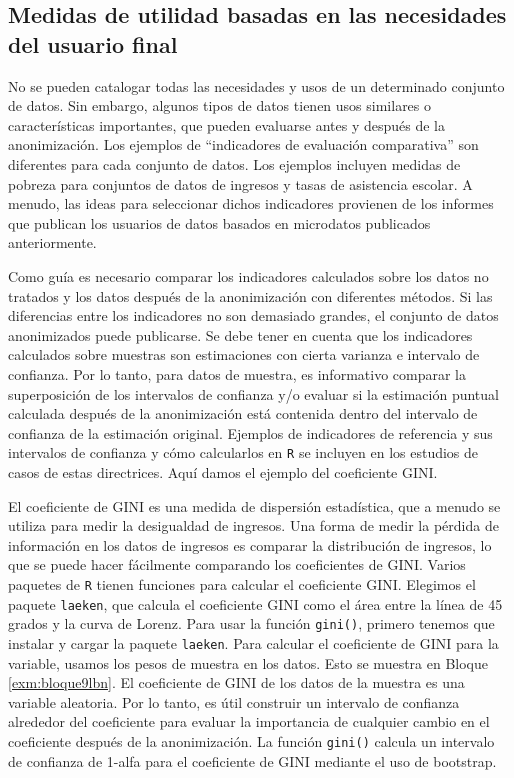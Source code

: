 \documentclass[]{book}
\theoremstyle{definition}
\theoremstyle{definition}
\theoremstyle{definition}
\theoremstyle{definition}
\theoremstyle{remark}
\begin{document}
\hypertarget{medidas-de-utilidad-basadas-en-las-necesidades-del-usuario-final}{%
\subsection{Medidas de utilidad basadas en las necesidades del usuario final}\label{medidas-de-utilidad-basadas-en-las-necesidades-del-usuario-final}}

No se pueden catalogar todas las necesidades y usos de un determinado conjunto de datos. Sin embargo, algunos tipos de datos tienen usos similares o características importantes, que pueden evaluarse antes y después de la anonimización. Los ejemplos de ``indicadores de evaluación comparativa'' \citep{templ2014} son diferentes para cada conjunto de datos. Los ejemplos incluyen medidas de pobreza para conjuntos de datos de ingresos y tasas de asistencia escolar. A menudo, las ideas para seleccionar dichos indicadores provienen de los informes que publican
los usuarios de datos basados en microdatos publicados anteriormente.

Como guía es necesario comparar los indicadores calculados sobre los datos no tratados y los datos después de la anonimización con diferentes métodos. Si las diferencias entre los indicadores no son demasiado grandes, el conjunto de datos anonimizados puede publicarse. Se debe tener en cuenta que los indicadores calculados sobre muestras son estimaciones con cierta varianza e intervalo de confianza. Por lo tanto, para datos de muestra, es informativo comparar la superposición de los intervalos de confianza y/o evaluar si la estimación puntual calculada después de la anonimización está contenida dentro del intervalo de confianza de la estimación original. Ejemplos de indicadores de referencia y sus intervalos de confianza y cómo calcularlos en \texttt{R} se incluyen en los estudios de casos de estas directrices. Aquí damos el ejemplo del coeficiente GINI.

El coeficiente de GINI es una medida de dispersión estadística, que a menudo se utiliza para medir la desigualdad de ingresos. Una forma de medir la pérdida de información en los datos de ingresos es comparar la distribución de ingresos, lo que se puede hacer fácilmente comparando los coeficientes de GINI. Varios paquetes de \texttt{R} tienen funciones para calcular el coeficiente GINI. Elegimos el paquete \texttt{laeken}, que calcula el coeficiente GINI como el área entre la línea de 45 grados y la curva de Lorenz. Para usar la función \texttt{gini()}, primero tenemos que instalar y cargar la paquete \texttt{laeken}. Para calcular el coeficiente de GINI para la variable, usamos los pesos de muestra en los datos. Esto se muestra en Bloque \ref{exm:bloque9lbn}. El coeficiente de GINI de los datos de la muestra es una variable aleatoria. Por lo tanto, es útil construir un intervalo de confianza alrededor del coeficiente para evaluar la importancia de cualquier cambio en el coeficiente después de la anonimización. La función \texttt{gini()} calcula un intervalo de confianza de 1-alfa para el coeficiente de GINI mediante el uso de bootstrap.
\end{document}
